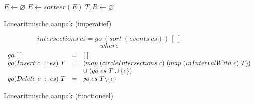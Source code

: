 \label{sec:linearitmisch}
\begin{figure}[H]
  \begin{algorithm}[H]
    $E \leftarrow \varnothing$\;
    $E \leftarrow sorteer(E)$\;
    $T, R \leftarrow \varnothing$\;
    \caption{Linearitmische aanpak (imperatief)}
  \end{algorithm}
\end{figure}

\begin{figure}[H]
\[
intersections\ cs = go\ (sort\ (events\ cs))\ [\ ]
\]
\[
where 
\]
\[
\begin{array}{l c l}
go\ [\ ] &= &[\ ]\\
go (Insert\ c\ :\ es)\ T &= &(map\ (circleIntersections\ c)\ (map\ (inIntervalWith\ c)\ T))\\
&& \cup\ (go\ es\ T\cup\{c\})\\
go (Delete\ c\ :\ es)\ T &= &go\ es\ T\backslash\{c\}\\
\end{array}
\]
\label{linearitmisch_functioneel}
\caption{Linearitmische aanpak (functioneel)}
\end{figure}



